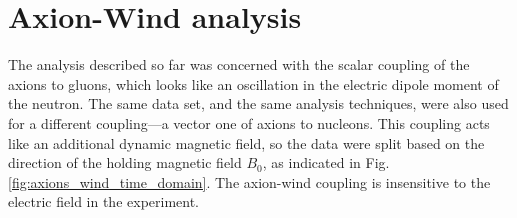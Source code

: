 




\section{Axion-Wind analysis}
The analysis described so far was concerned with the scalar coupling of the axions to gluons, which looks like an oscillation in the electric dipole moment of the neutron.
The same data set, and the same analysis techniques, were also used for a different coupling---a vector one of axions to nucleons. This coupling acts like an additional dynamic magnetic field, so the data were split based on the direction of the holding magnetic field $B_0$, as indicated in Fig.\,\ref{fig:axions_wind_time_domain}. The axion-wind coupling is insensitive to the electric field in the experiment.

